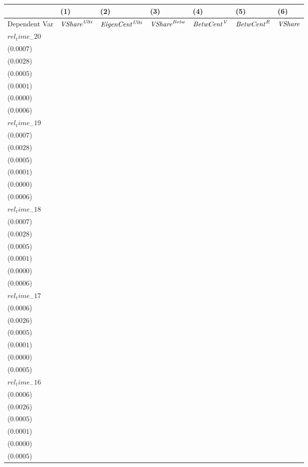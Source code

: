 \begin{tabular}{lllllll}
\toprule
 & (1) & (2) & (3) & (4) & (5) & (6) \\
\midrule
Dependent Var & ${\it {VShare}^{\it Ulti}}$ & ${\it EigenCent^{\it Ulti}}$ & ${\it VShare}^{\it Betw}$ & ${\it BetwCent}^{\it V}$ & ${\it BetwCent}^{\it E}$ & ${\it VShare}$ \\
$rel_time_-20$ & \makecell{$0.0009^{}$ \\ ($0.0007$)} & \makecell{$0.0078^{***}$ \\ ($0.0028$)} & \makecell{$-0.0020^{***}$ \\ ($0.0005$)} & \makecell{$-0.0002^{***}$ \\ ($0.0001$)} & \makecell{$-0.0001^{***}$ \\ ($0.0000$)} & \makecell{$0.0008^{}$ \\ ($0.0006$)} \\
$rel_time_-19$ & \makecell{$0.0008^{}$ \\ ($0.0007$)} & \makecell{$0.0051^{*}$ \\ ($0.0028$)} & \makecell{$-0.0021^{***}$ \\ ($0.0005$)} & \makecell{$-0.0002^{***}$ \\ ($0.0001$)} & \makecell{$-0.0001^{***}$ \\ ($0.0000$)} & \makecell{$0.0004^{}$ \\ ($0.0006$)} \\
$rel_time_-18$ & \makecell{$-0.0003^{}$ \\ ($0.0007$)} & \makecell{$-0.0006^{}$ \\ ($0.0028$)} & \makecell{$-0.0012^{**}$ \\ ($0.0005$)} & \makecell{$0.0000^{}$ \\ ($0.0001$)} & \makecell{$-0.0000^{**}$ \\ ($0.0000$)} & \makecell{$-0.0003^{}$ \\ ($0.0006$)} \\
$rel_time_-17$ & \makecell{$-0.0002^{}$ \\ ($0.0006$)} & \makecell{$-0.0024^{}$ \\ ($0.0026$)} & \makecell{$0.0032^{***}$ \\ ($0.0005$)} & \makecell{$0.0007^{***}$ \\ ($0.0001$)} & \makecell{$0.0001^{***}$ \\ ($0.0000$)} & \makecell{$0.0009^{*}$ \\ ($0.0005$)} \\
$rel_time_-16$ & \makecell{$-0.0005^{}$ \\ ($0.0006$)} & \makecell{$-0.0047^{*}$ \\ ($0.0026$)} & \makecell{$0.0018^{***}$ \\ ($0.0005$)} & \makecell{$0.0004^{***}$ \\ ($0.0001$)} & \makecell{$0.0001^{***}$ \\ ($0.0000$)} & \makecell{$0.0001^{}$ \\ ($0.0005$)} \\

\end{tabular}
